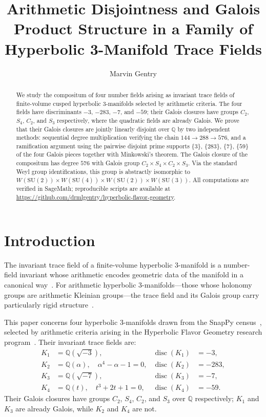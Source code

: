 \documentclass[12pt]{amsart}
\title[Galois Product Structure of Trace Fields]{Arithmetic
  Disjointness and Galois Product Structure in a
  Family of Hyperbolic 3-Manifold Trace Fields}
\author{Marvin Gentry}
\DeclareMathOperator{\disc}{disc}
\newcommand{\Q}{\mathbb{Q}}
\begin{document}
\begin{abstract}
We study the compositum of four number fields arising as invariant trace
fields of finite-volume cusped hyperbolic 3-manifolds selected by arithmetic
criteria.
The four fields have discriminants $-3$, $-283$, $-7$, and $-59$; their
Galois closures have groups $C_2$, $S_4$, $C_2$, and $S_3$ respectively,
where the quadratic fields are already Galois. We prove that
their Galois closures are jointly linearly disjoint over $\Q$ by two
independent methods: sequential degree multiplication verifying the chain
$144\to 288\to 576$, and a ramification argument using the pairwise
disjoint prime supports $\{3\}$, $\{283\}$, $\{7\}$, $\{59\}$ of the four
Galois pieces together with Minkowski's theorem. The Galois closure of the
compositum has degree $576$ with Galois group
$C_2\times S_4\times C_2\times S_3$. Via the standard Weyl group
identifications, this group is abstractly isomorphic to
$W(\mathrm{SU}(2))\times W(\mathrm{SU}(4))\times W(\mathrm{SU}(2))\times
W(\mathrm{SU}(3))$. All computations are verified in SageMath; reproducible
scripts are available at
\url{https://github.com/drmlgentry/hyperbolic-flavor-geometry}.
\end{abstract}
\maketitle

\section{Introduction}

The invariant trace field of a finite-volume hyperbolic 3-manifold is a
number-field invariant whose arithmetic encodes geometric data of the
manifold in a canonical way~\cite{MR}. For arithmetic hyperbolic
3-manifolds---those whose holonomy groups are arithmetic Kleinian
groups---the trace field and its Galois group carry particularly rigid
structure~\cite{NR}.

This paper concerns four hyperbolic 3-manifolds drawn from the SnapPy
census~\cite{SnapPy}, selected by arithmetic criteria arising in the
Hyperbolic Flavor Geometry research program~\cite{HFG}. Their invariant
trace fields are:
\begin{align*}
K_1 &= \Q(\sqrt{-3}), & \disc(K_1)&=-3,\\
K_2 &= \Q(\alpha),\quad\alpha^4-\alpha-1=0, & \disc(K_2)&=-283,\\
K_3 &= \Q(\sqrt{-7}), & \disc(K_3)&=-7,\\
K_4 &= \Q(t),\quad t^3+2t+1=0, & \disc(K_4)&=-59.
\end{align*}
Their Galois closures have groups $C_2$, $S_4$, $C_2$, and $S_3$ over
$\Q$ respectively; $K_1$ and $K_3$ are already Galois, while $K_2$ and
$K_4$ are not.
\end{document}
